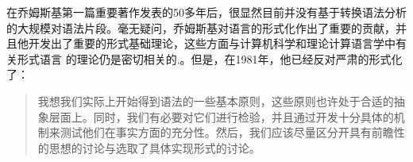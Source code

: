 
在乔姆斯基第一篇重要著作发表的50多年后，很显然目前并没有基于转换语法分析的大规模对语法片段。毫无疑问，乔姆斯基对语言的形式化作出了重要的贡献，并且他开发出了重要的形式基础理论，这些方面与计算机科学和理论计算语言学中有关形式语言 的理论仍是密切相关的\citep{Chomsky59a-u}.。但是，在1981年，他已经反对严肃的形式化了：
\begin{quote}
我想我们实际上开始得到语法的一些基本原则，这些原则也许处于合适的抽象层面上。同时，我们有必要对它们进行检验，并且通过开发十分具体的机制来测试他们在事实方面的充分性。然后，我们应该尽量区分开具有前瞻性的思想的讨论与选取了具体实现形式的讨论。\citep*[--3]{Chomsky81a}
\end{quote}
